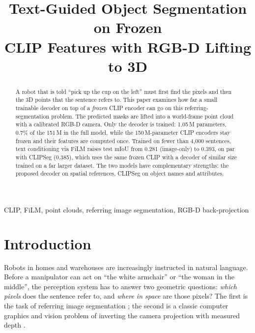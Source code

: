 \documentclass[conference,a4paper]{IEEEtran}
\begin{document}
\title{Text-Guided Object Segmentation on Frozen\\CLIP Features with RGB-D Lifting to 3D}

\author{
}

\maketitle

\begin{abstract}
A robot that is told \enquote{pick up the cup on the left} must first find the pixels and then the
3D points that the sentence refers to. This paper examines how far a small trainable decoder on top
of a \emph{frozen} CLIP encoder can go on this referring-segmentation problem. The predicted masks are
lifted into a world-frame point cloud with a calibrated RGB-D camera. Only the decoder is trained:
1.05\,M parameters, 0.7\% of the 151\,M in the full model, while the 150\,M-parameter CLIP encoders
stay frozen and their features are computed once. Trained on fewer than 4,000 sentences, text
conditioning via FiLM raises test mIoU from 0.281 (image-only) to 0.393, on par with CLIPSeg (0.385),
which uses the same frozen CLIP with a decoder of similar size trained on a far larger dataset. The two models have complementary strengths: the proposed decoder
on spatial references, CLIPSeg on object names and attributes.
\end{abstract}

\begin{IEEEkeywords}
CLIP, FiLM, point clouds, referring image segmentation, RGB-D back-projection
\end{IEEEkeywords}

\section{Introduction}
\label{sec:introduction}

Robots in homes and warehouses are increasingly instructed in natural language. Before a
manipulator can act on \enquote{the white armchair} or \enquote{the woman in the middle}, the
perception system has to answer two geometric questions: \emph{which pixels} does the sentence refer
to, and \emph{where in space} are those pixels? The first is the task of referring image segmentation
\cite{hu2016segmentation}; the second is a classic computer graphics and vision problem of inverting
the camera projection with measured depth \cite{hartley2004mvg}.
\end{document}
